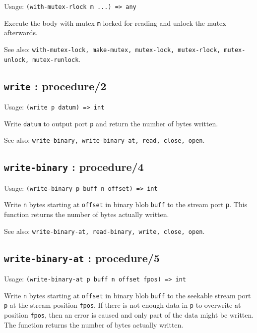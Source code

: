 \documentclass[
]{article}
\newcommand{\passthrough}[1]{#1}
\begin{document}
Usage: \passthrough{\lstinline!(with-mutex-rlock m ...) => any!}

Execute the body with mutex \passthrough{\lstinline!m!} locked for
reading and unlock the mutex afterwards.

See also:
\passthrough{\lstinline!with-mutex-lock, make-mutex, mutex-lock, mutex-rlock, mutex-unlock, mutex-runlock!}.

\hypertarget{write-procedure2-1}{%
\subsection{\texorpdfstring{\texttt{write} :
procedure/2}{write : procedure/2}}\label{write-procedure2-1}}

Usage: \passthrough{\lstinline!(write p datum) => int!}

Write \passthrough{\lstinline!datum!} to output port
\passthrough{\lstinline!p!} and return the number of bytes written.

See also:
\passthrough{\lstinline!write-binary, write-binary-at, read, close, open!}.

\hypertarget{write-binary-procedure4-1}{%
\subsection{\texorpdfstring{\texttt{write-binary} :
procedure/4}{write-binary : procedure/4}}\label{write-binary-procedure4-1}}

Usage: \passthrough{\lstinline!(write-binary p buff n offset) => int!}

Write \passthrough{\lstinline!n!} bytes starting at
\passthrough{\lstinline!offset!} in binary blob
\passthrough{\lstinline!buff!} to the stream port
\passthrough{\lstinline!p!}. This function returns the number of bytes
actually written.

See also:
\passthrough{\lstinline!write-binary-at, read-binary, write, close, open!}.

\hypertarget{write-binary-at-procedure5-1}{%
\subsection{\texorpdfstring{\texttt{write-binary-at} :
procedure/5}{write-binary-at : procedure/5}}\label{write-binary-at-procedure5-1}}

Usage:
\passthrough{\lstinline!(write-binary-at p buff n offset fpos) => int!}

Write \passthrough{\lstinline!n!} bytes starting at
\passthrough{\lstinline!offset!} in binary blob
\passthrough{\lstinline!buff!} to the seekable stream port
\passthrough{\lstinline!p!} at the stream position
\passthrough{\lstinline!fpos!}. If there is not enough data in
\passthrough{\lstinline!p!} to overwrite at position
\passthrough{\lstinline!fpos!}, then an error is caused and only part of
the data might be written. The function returns the number of bytes
actually written.
\end{document}
